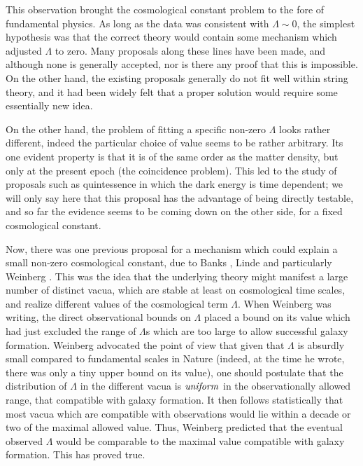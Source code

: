 \documentclass[aps,amsfonts]{ar2e}
\begin{document}
This observation brought the cosmological constant problem to the
fore of fundamental physics.  As long as the data was consistent
with $\Lambda \sim 0$, the simplest hypothesis was that the correct
theory would contain some mechanism which adjusted $\Lambda$ to
zero.  Many proposals along these lines have been made, and
although none is generally accepted, nor is there any proof that
this is impossible. On the other hand, the existing proposals
generally do not fit well within string theory, and it had been
widely felt that a proper solution would require some essentially
new idea.

On the other hand, the problem of fitting a specific non-zero
$\Lambda$ looks rather different, indeed the particular choice of
value seems to be rather arbitrary.  Its one evident property is
that it is of the same order as the matter density, but only at the
present epoch (the coincidence problem).  This led to the study of
proposals such as quintessence in which the dark energy is time
dependent; we will only say here that this proposal has the
advantage of being directly testable, and so far the evidence seems
to be coming down on the other side, for a fixed cosmological
constant.

Now, there was one previous proposal for a mechanism which could
explain a small non-zero cosmological constant, due to
Banks \cite{Banks:1984tw}, Linde
\cite{Linde:1984ir} and particularly Weinberg
\cite{Weinberg:1987dv}.
This was the idea that the
underlying theory might manifest a large number of distinct vacua,
which are stable at least on cosmological time scales, and realize
different values of the cosmological term $\Lambda$.
When Weinberg was writing, the
direct observational bounds on $\Lambda$ placed a bound on its value
which had just excluded the range of $\Lambda$s which are too large to
allow successful galaxy formation.  Weinberg advocated the point of
view that given that $\Lambda$ is absurdly small compared to
fundamental scales in Nature (indeed, at the time he wrote, there was
only a tiny upper bound on its value), one should postulate that the
distribution of $\Lambda$ in the different vacua is ${\it uniform}$ in
the observationally allowed range, that compatible
with galaxy formation.  It then follows statistically that most
vacua which are compatible with observations would lie within a decade
or two of the maximal allowed value.  Thus, Weinberg predicted
that the eventual observed $\Lambda$ would be comparable
to the maximal value compatible with galaxy formation.  This has
proved true.
\end{document}

